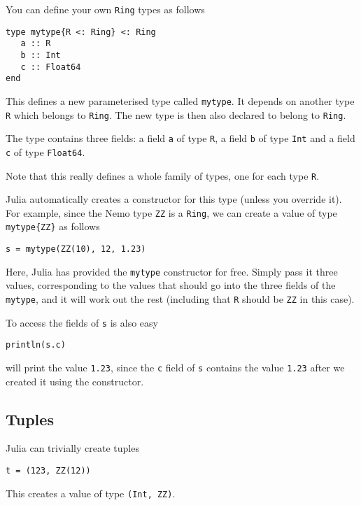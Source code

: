 \documentclass[a4paper,10pt]{article}
\newcommand{\code}{\lstinline}
\begin{document}
{{{{You can define your own \code{Ring} types as follows

\begin{lstlisting}
type mytype{R <: Ring} <: Ring
   a :: R
   b :: Int
   c :: Float64
end
\end{lstlisting}

This defines a new parameterised type called \code{mytype}. It depends on another type
\code{R} which belongs to \code{Ring}. The new type is then also declared to belong to
\code{Ring}.

The type contains three fields: a field \code{a} of type \code{R}, a field \code{b} of
type \code{Int} and a field \code{c} of type \code{Float64}.

Note that this really defines a whole family of types, one for each type \code{R}.

Julia automatically creates a constructor for this type (unless you override it). For
example, since the Nemo type \code{ZZ} is a \code{Ring}, we can create a value of
type \code|mytype{ZZ}| as follows

\begin{lstlisting}
s = mytype(ZZ(10), 12, 1.23)
\end{lstlisting}

Here, Julia has provided the \code{mytype} constructor for free. Simply pass it three
values, corresponding to the values that should go into the three fields of the 
\code{mytype}, and it will work out the rest (including that \code{R} should be
\code{ZZ} in this case).

To access the fields of \code{s} is also easy

\begin{lstlisting}
println(s.c)
\end{lstlisting}

will print the value \code{1.23}, since the \code{c} field of \code{s} contains the
value \code{1.23} after we created it using the constructor.

\subsection{Tuples}

Julia can trivially create tuples

\begin{lstlisting}
t = (123, ZZ(12))
\end{lstlisting}

This creates a value of type \code{(Int, ZZ)}.

}}}}
\end{document}
